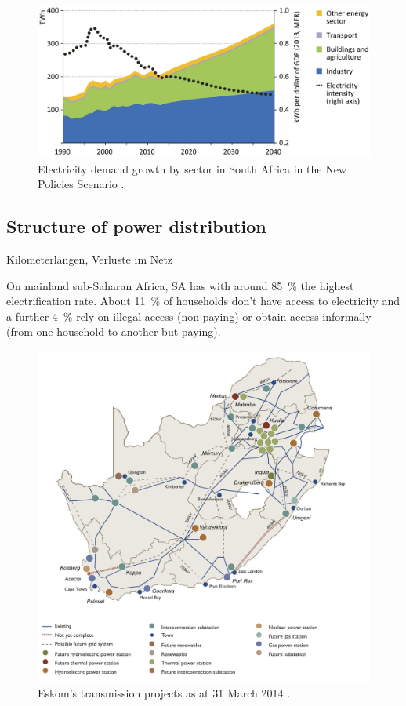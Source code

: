\begin{figure}[!h] %
\centering
\includegraphics[width=0.9\linewidth]{FIG/SA_Electricity_demand_growth}
\caption[Electricity demand growth by sector in South Africa in the New Policies Scenario.]{Electricity demand growth by sector in South Africa in the New Policies Scenario \cite{IEA2014f}.}\label{Abb1}
\end{figure}

\subsection{Structure of power distribution}
Kilometerlängen, Verluste im Netz \cite{Eskom2014a}

On mainland sub-Saharan Africa, SA has with around 85~\% the highest electrification rate. About 11~\% of households don't have access to electricity and a further 4~\% rely on illegal access (non-paying) or obtain access informally (from one household to another but paying). \cite{IEA2014f}

\begin{figure}[htbp] %
\centering
\includegraphics[width=0.9\linewidth]{FIG/transmissionprojekts}
\caption[Eskom’s transmission projects as at 31 March 2014.]{Eskom’s transmission projects as at 31 March 2014 \cite{Eskom2014}.}\label{Abb1}
\end{figure}

